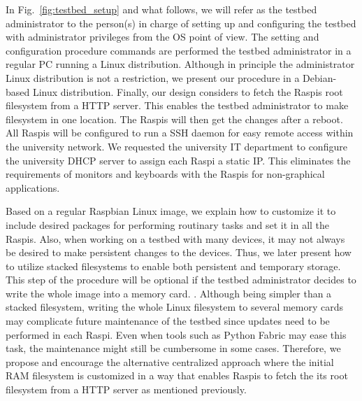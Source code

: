 
In Fig.~\ref{fig:testbed_setup} and what follows, we will refer
as the testbed administrator to the person(s) in charge of setting up and configuring
the testbed with administrator privileges from the \ac{OS} point of view.
The setting and configuration procedure commands are performed the testbed administrator in a
regular \ac{PC} running a Linux distribution. Although in principle the administrator
Linux distribution is not a restriction, we present our procedure in a Debian-based Linux
distribution. Finally, our design considers to fetch the \ac{Raspi}s
root filesystem from a \ac{HTTP} server. This enables the testbed administrator to
make filesystem in one location. The \ac{Raspi}s will then get the changes after a reboot.
All \ac{Raspi}s will be configured to run a \ac{SSH} daemon for easy remote access
within the university network. We requested the university \ac{IT} department to
configure the university \ac{DHCP} server to assign each \ac{Raspi} a static
\ac{IP}. This eliminates the requirements of monitors and keyboards with the
\ac{Raspi}s for non-graphical applications.

Based on a regular Raspbian Linux image, we explain how
to customize it to include desired packages for performing routinary tasks and set it
in all the \ac{Raspi}s. Also, when working on a testbed with many devices, it may not always be
desired to make persistent changes to the devices. Thus, we later present how to utilize
stacked filesystems to enable both persistent and temporary
storage. This step of the procedure will be optional if the testbed
administrator decides to write the whole image into a memory card. .
Although being simpler than a stacked filesystem, writing the whole Linux
filesystem to several memory cards may complicate future
maintenance of the testbed since updates need to be performed in each \ac{Raspi}.
Even when tools such as Python Fabric may ease this task, the maintenance might still
be cumbersome in some cases. Therefore, we propose and encourage the alternative centralized
approach where the initial \ac{RAM} filesystem is customized in a way that
enables \ac{Raspi}s to fetch the its root filesystem from a \ac{HTTP} server as
mentioned previously.

